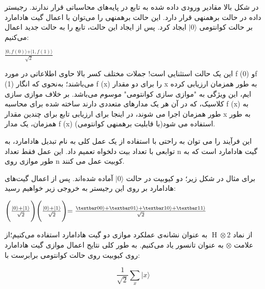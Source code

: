 \documentclass{book}
\begin{document}
در شکل بالا مقادیر ورودی داده شده به تابع  در پایه‌های محاسباتی قرار ندارند. رجیستر داده در حالت برهمنهی  قرار دارد. این حالت برهمنهی را می‌توان با اعمال گیت هادامارد بر حالت کوانتومی $\vert 0 \rangle$ ایجاد کرد. پس از ایجاد این حالت، تابع  را به حالت جدید اعمال می‌کنیم:
\begin{center}
	$\frac{\vert 0,f(0) \rangle +\vert 1,f(1) \rangle }{\sqrt{2}}$
\end{center}

این یک حالت استثنایی است! جملات مختلف کسر بالا حاوی اطلاعاتی در مورد f (0) وf (1) می‌باشند؛ به‌نحوی که انگار f (x) را برای دو مقدار x به طور همزمان ارزیابی کرده ایم، این ویژگی به "موازی  سازی کوانتومی" موسوم می‌باشد. بر خلاف موازی سازی کلاسیک، که در آن هر یک مدارهای متعددی دارند ساخته شده برای محاسبه f (x) به طور همزمان اجرا می شوند، در اینجا برای ارزیابی تابع برای چندین مقدار x به طور همزمان، یک مدار f (x) (با قابلیت برهمنهی کوانتومی)استفاده می شود.

این فرآیند را می توان به راحتی  با استفاده از یک عمل کلی به نام تبدیل هادامارد، به توابعی با تعداد بیت دلخواه تعمیم داد. این عمل فقط تعداد n گیت هادامارد است که به طور موازی روی n کوبیت عمل می کنند.

برای مثال در شکل زیر؛ دو کیوبیت در حالت $\vert 0 \rangle$ آماده شده‌‌اند. پس از اعمال گیت‌های هادامارد بر روی این رجیستر به خروجی زیر خواهیم رسید: 

\begin{center}
	$ \Biggl( \frac{\vert 0 \rangle + \vert 1 \rangle}{\sqrt{2}}\Biggl)\Biggl( \frac{\vert 0 \rangle + \vert 1 \rangle}{\sqrt{2}}\Biggl) = \frac{\textbar00\rangle + \textbar01\rangle + \textbar10\rangle + \textbar11\rangle}{\sqrt{2}}$

\end{center}

از نماد $\operatorname{H} \otimes 2$ به عنوان نشانه‌ی عملکرد موازی دو گیت هادامارد استفاده می‌کنیم؛از علامت $\otimes$ به عنوان تانسور یاد می‌کنیم. به طور کلی نتایج اعمال موازی گیت هادامارد روی  کیوبیت روی حالت کوانتومی برابرست با:

\begin{center}
	\[\frac{1}{\sqrt{2}} \sum_{x} \vert x \rangle\]
\end{center}
\end{document}
